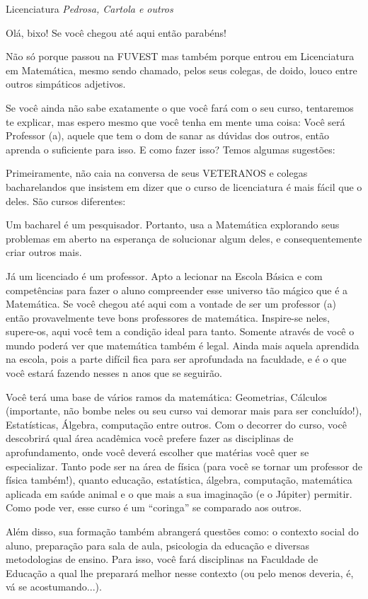 \begin{subsecao}{Licenciatura}
{\em Pedrosa, Cartola e outros}

Olá, bixo! Se você chegou até aqui então parabéns!

Não só porque passou na FUVEST mas também porque entrou em Licenciatura em
Matemática, mesmo sendo chamado, pelos seus colegas, de doido, louco entre
outros simpáticos adjetivos.

Se você ainda não sabe exatamente o que você fará com o seu curso, tentaremos
te explicar, mas espero mesmo que você tenha em mente uma coisa: Você será
Professor (a), aquele que tem o dom de sanar as dúvidas dos outros, então
aprenda o suficiente para isso. E como fazer isso? Temos algumas sugestões:

Primeiramente, não caia na conversa de seus VETERANOS e colegas bacharelandos
que insistem em dizer que o curso de licenciatura é mais fácil que o deles. São
cursos diferentes:

Um bacharel é um pesquisador. Portanto, usa a Matemática explorando seus
problemas em aberto na esperança de solucionar algum deles, e consequentemente
criar outros mais.

Já um licenciado é um professor. Apto a lecionar na Escola Básica e com
competências para fazer o aluno compreender esse universo tão mágico que é a
Matemática. Se você chegou até aqui com a vontade de ser um professor (a) então
provavelmente teve bons professores de matemática. Inspire-se neles, supere-os,
aqui você tem a condição ideal para tanto. Somente através de você o mundo
poderá ver que matemática também é legal. Ainda mais aquela aprendida na
escola, pois a parte difícil fica para ser aprofundada na faculdade, e é o que
você estará fazendo nesses n anos que se seguirão.

Você terá uma base de vários ramos da matemática: Geometrias,
Cálculos (importante, não bombe neles ou seu curso vai demorar mais para ser
concluído!), Estatísticas, Álgebra, computação entre outros. Com o decorrer do
curso, você descobrirá qual área acadêmica você prefere fazer as disciplinas de
aprofundamento, onde você deverá escolher que matérias você quer se
especializar. Tanto pode ser na área de física (para você se tornar um
professor de física também!), quanto educação, estatística, álgebra,
computação, matemática aplicada em saúde animal e o que mais a sua
imaginação (e o Júpiter) permitir. Como pode ver, esse curso é um “coringa” se
comparado aos outros.

Além disso, sua formação também abrangerá questões como: o contexto social do
aluno, preparação para sala de aula, psicologia da educação e diversas
metodologias de ensino. Para isso, você fará disciplinas na Faculdade de
Educação a qual lhe preparará melhor nesse contexto (ou pelo menos deveria, é,
vá se acostumando...).


\end{subsecao}
